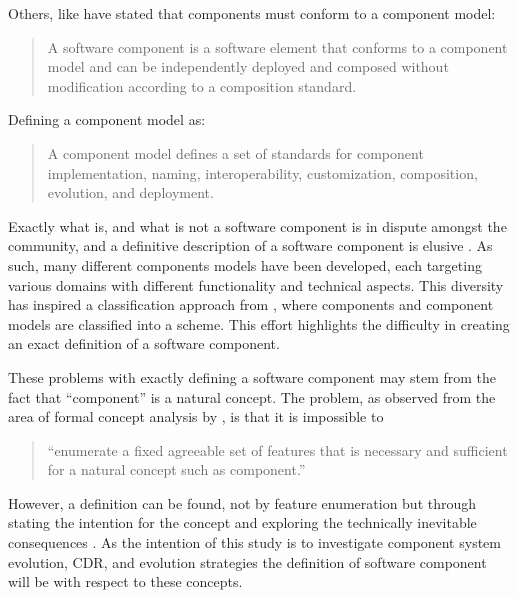 Others, like \citep{heineman2001component} have stated that components must conform to a component model: 
\begin{quotation}
A software component is a software element that conforms to a component model and can be independently deployed and composed without modification according to a composition standard.
\end{quotation}

Defining a component model as:
\begin{quotation}
A component model defines a set of standards for component implementation, naming, interoperability, customization, composition, evolution, and deployment.
\end{quotation}

Exactly what is, and what is not a software component is in dispute amongst the community,
and a definitive description of a software component is elusive \citep{vasa2007patterns}.
As such, many different components models have been developed, each targeting various domains with different functionality and technical aspects.
This diversity has inspired a classification approach from \citep{Crnkovic2011}, where components and component models are classified into a scheme.
This effort highlights the difficulty in creating an exact definition of a software component. 

These problems with exactly defining a software component may stem from the fact that ``component'' is a natural concept.
The problem, as observed from the area of formal concept analysis \citep{Ganter1999} by \citep{Szyperski2002}, is that it is impossible to

\begin{quotation} 
``enumerate a fixed agreeable set of features that is necessary and sufficient for a natural concept such as component.'' 
\end{quotation}

However, a definition can be found, not by feature enumeration but through stating the intention for the concept and exploring the technically inevitable consequences \citep{Szyperski2002}. 
As the intention of this study is to investigate component system evolution, CDR, and evolution strategies
the definition of software component will be with respect to these concepts.

